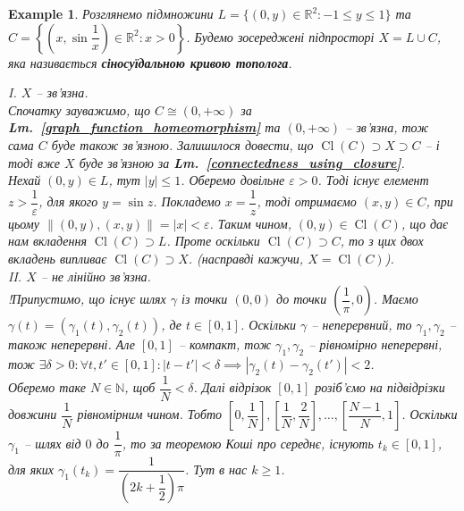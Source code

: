 \documentclass[a4paper, 10pt]{article}
\theoremstyle{theoremdd}
\newtheorem{example}[theorem]{Example}
\newcommand\lmref[1]{\textbf{Lm.~\ref{#1}}}
\DeclareMathOperator{\Cl}{Cl}
\begin{document}
\begin{example}
Розглянемо підмножини $L = \{(0,y) \in \mathbb{R}^2 : -1 \leq y \leq 1\}$ та $C = \left\{ \left(x, \sin \dfrac{1}{x} \right) \in \mathbb{R}^2 : x > 0 \right\}$. Будемо зосереджені підпросторі $X = L \cup C$, яка називається \textbf{сіносуїдальною кривою тополога}.
\begin{figure}[H]
\centering
{}
\end{figure}
\noindent
I. \textit{$X$ -- зв'язна.}\\
Спочатку зауважимо, що $C \cong (0,+\infty)$ за \lmref{graph_function_homeomorphism} та $(0,+\infty)$ -- зв'язна, тож сама $C$ буде також зв'язною. Залишилося довести, що $\Cl(C) \supset X \supset C$ -- і тоді вже $X$ буде зв'язною за \lmref{connectedness_using_closure}.\\
Нехай $(0,y) \in L$, тут $|y| \leq 1$. Оберемо довільне $\varepsilon > 0$. Тоді існує елемент $z > \dfrac{1}{\varepsilon}$, для якого $y = \sin z$. Покладемо $x = \dfrac{1}{z}$, тоді отримаємо $(x,y) \in C$, при цьому $\| (0,y), (x,y) \| = |x| < \varepsilon$. Таким чином, $(0,y) \in \Cl(C)$, що дає нам вкладення $\Cl(C) \supset L$. Проте оскільки $\Cl(C) \supset C$, то з цих двох вкладень випливає $\Cl(C) \supset X$. (насправді кажучи, $X = \Cl(C)$).
\bigskip \\
II. \textit{$X$ -- не лінійно зв'язна.}\\
!Припустимо, що існує шлях $\gamma$ із точки $(0,0)$ до точки $\left( \dfrac{1}{\pi}, 0 \right)$. Маємо $\gamma(t) = (\gamma_1(t),\gamma_2(t))$, де $t \in [0,1]$. Оскільки $\gamma$ -- неперервний, то $\gamma_1,\gamma_2$ -- також неперервні. Але $[0,1]$ -- компакт, тож $\gamma_1,\gamma_2$ -- рівномірно неперервні, тож $\exists \delta > 0: \forall t,t' \in [0,1]: |t-t'| < \delta \implies |\gamma_2(t) - \gamma_2(t')| < 2$.\\
Оберемо таке $N \in \mathbb{N}$, щоб $\dfrac{1}{N} < \delta$. Далі відрізок $[0,1]$ розіб'ємо на підвідрізки довжини $\dfrac{1}{N}$ рівномірним чином. Тобто $\left[0, \dfrac{1}{N} \right], \left[\dfrac{1}{N}, \dfrac{2}{N} \right], \dots, \left[ \dfrac{N-1}{N}, 1 \right]$. Оскільки $\gamma_1$ -- шлях від $0$ до $\dfrac{1}{\pi}$, то за теоремою Коші про середнє, існують $t_k \in [0,1]$, для яких $\gamma_1(t_k) = \dfrac{1}{\left( 2k + \dfrac{1}{2} \right)\pi}$. Тут в нас $k \geq 1$.\\

\end{example}
\end{document}
